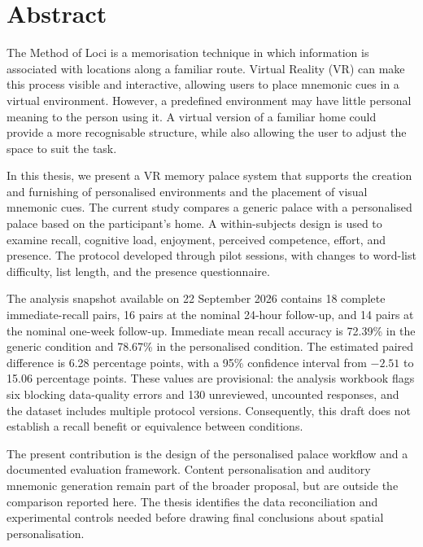 \chapter*{Abstract}
\label{chap:abstract}
The Method of Loci is a memorisation technique in which information is associated with locations along a familiar route. Virtual Reality (VR) can make this process visible and interactive, allowing users to place mnemonic cues in a virtual environment. However, a predefined environment may have little personal meaning to the person using it. A virtual version of a familiar home could provide a more recognisable structure, while also allowing the user to adjust the space to suit the task.

In this thesis, we present a VR memory palace system that supports the creation and furnishing of personalised environments and the placement of visual mnemonic cues. The current study compares a generic palace with a personalised palace based on the participant's home. A within-subjects design is used to examine recall, cognitive load, enjoyment, perceived competence, effort, and presence. The protocol developed through pilot sessions, with changes to word-list difficulty, list length, and the presence questionnaire.

The analysis snapshot available on 22 September 2026 contains 18 complete immediate-recall pairs, 16 pairs at the nominal 24-hour follow-up, and 14 pairs at the nominal one-week follow-up. Immediate mean recall accuracy is 72.39\% in the generic condition and 78.67\% in the personalised condition. The estimated paired difference is 6.28 percentage points, with a 95\% confidence interval from $-2.51$ to 15.06 percentage points. These values are provisional: the analysis workbook flags six blocking data-quality errors and 130 unreviewed, uncounted responses, and the dataset includes multiple protocol versions. Consequently, this draft does not establish a recall benefit or equivalence between conditions.

The present contribution is the design of the personalised palace workflow and a documented evaluation framework. Content personalisation and auditory mnemonic generation remain part of the broader proposal, but are outside the comparison reported here. The thesis identifies the data reconciliation and experimental controls needed before drawing final conclusions about spatial personalisation.

